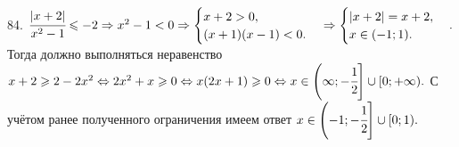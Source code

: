 84. $\cfrac{|x+2|}{x^2-1}\leqslant-2\Rightarrow x^2-1<0\Rightarrow \begin{cases}x+2>0,\\ (x+1)(x-1)<0.\end{cases} \Rightarrow\begin{cases}|x+2|=x+2,\\ x\in (-1;1).\end{cases}.$ Тогда должно выполняться неравенство $x+2\geqslant 2-2x^2 \Leftrightarrow 2x^2+x \geqslant 0 \Leftrightarrow
x(2x+1)\geqslant 0 \Leftrightarrow x\in\left(\-\infty;-\cfrac{1}{2}\right]\cup[0;+\infty).$ С учётом ранее полученного ограничения имеем ответ $x\in \left(-1;-\cfrac{1}{2}\right]\cup[0;1).$\\
